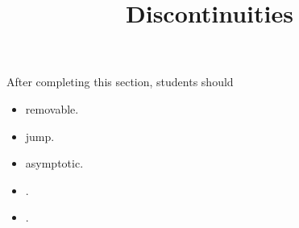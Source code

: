 \documentclass{ximera}
\title{Discontinuities}
\begin{document}
\begin{abstract}
\end{abstract}
\maketitle

\begin{sectionOutcomes}
After completing this section, students should 

\begin{itemize}
\item removable.
\item jump.
\item asymptotic.
\item .
\item .
\end{itemize}
\end{sectionOutcomes}
\end{document}

